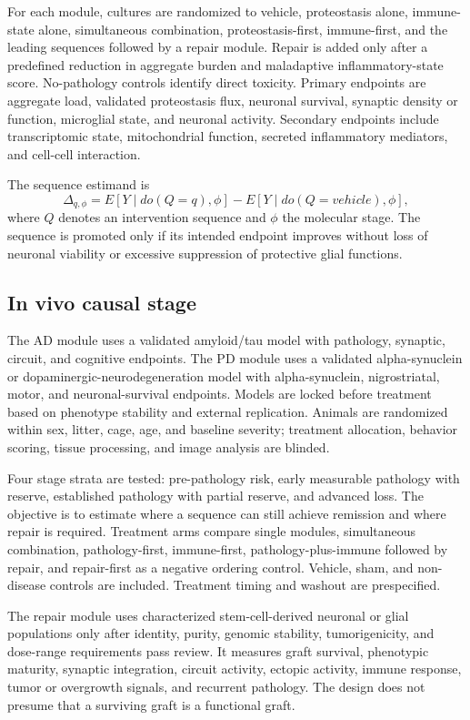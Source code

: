 \documentclass[conference]{IEEEtran}
\begin{document}
For each module, cultures are randomized to vehicle, proteostasis alone, immune-state alone, simultaneous combination, proteostasis-first, immune-first, and the leading sequences followed by a repair module. Repair is added only after a predefined reduction in aggregate burden and maladaptive inflammatory-state score. No-pathology controls identify direct toxicity. Primary endpoints are aggregate load, validated proteostasis flux, neuronal survival, synaptic density or function, microglial state, and neuronal activity. Secondary endpoints include transcriptomic state, mitochondrial function, secreted inflammatory mediators, and cell-cell interaction.

The sequence estimand is
\begin{equation}
\Delta_{q,\phi}=E[Y\mid do(Q=q),\phi]-E[Y\mid do(Q=vehicle),\phi],
\label{eq:sequence}
\end{equation}
where $Q$ denotes an intervention sequence and $\phi$ the molecular stage. The sequence is promoted only if its intended endpoint improves without loss of neuronal viability or excessive suppression of protective glial functions.

\subsection{In vivo causal stage}
The AD module uses a validated amyloid/tau model with pathology, synaptic, circuit, and cognitive endpoints. The PD module uses a validated alpha-synuclein or dopaminergic-neurodegeneration model with alpha-synuclein, nigrostriatal, motor, and neuronal-survival endpoints. Models are locked before treatment based on phenotype stability and external replication. Animals are randomized within sex, litter, cage, age, and baseline severity; treatment allocation, behavior scoring, tissue processing, and image analysis are blinded.

Four stage strata are tested: pre-pathology risk, early measurable pathology with reserve, established pathology with partial reserve, and advanced loss. The objective is to estimate where a sequence can still achieve remission and where repair is required. Treatment arms compare single modules, simultaneous combination, pathology-first, immune-first, pathology-plus-immune followed by repair, and repair-first as a negative ordering control. Vehicle, sham, and non-disease controls are included. Treatment timing and washout are prespecified.

The repair module uses characterized stem-cell-derived neuronal or glial populations only after identity, purity, genomic stability, tumorigenicity, and dose-range requirements pass review. It measures graft survival, phenotypic maturity, synaptic integration, circuit activity, ectopic activity, immune response, tumor or overgrowth signals, and recurrent pathology. The design does not presume that a surviving graft is a functional graft.
\end{document}
